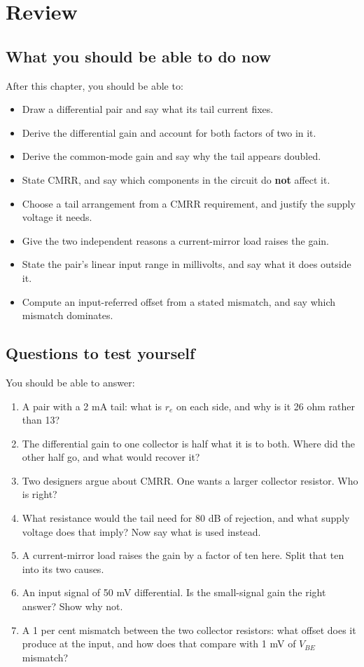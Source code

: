 

\section{Review}
\label{c9:sec:review}

\subsection*{What you should be able to do now}
After this chapter, you should be able to:
\begin{itemize}
  \item Draw a differential pair and say what its tail current fixes.
  \item Derive the differential gain and account for both factors of two in it.
  \item Derive the common-mode gain and say why the tail appears doubled.
  \item State CMRR, and say which components in the circuit do \textbf{not} affect it.
  \item Choose a tail arrangement from a CMRR requirement, and justify the supply voltage it needs.
  \item Give the two independent reasons a current-mirror load raises the gain.
  \item State the pair's linear input range in millivolts, and say what it does outside it.
  \item Compute an input-referred offset from a stated mismatch, and say which mismatch dominates.
\end{itemize}

\subsection*{Questions to test yourself}
You should be able to answer:
\begin{enumerate}
  \item A pair with a 2 mA tail: what is $r_e$ on each side, and why is it 26 ohm rather than 13?
  \item The differential gain to one collector is half what it is to both. Where did the other half go, and what would recover it?
  \item Two designers argue about CMRR. One wants a larger collector resistor. Who is right?
  \item What resistance would the tail need for 80 dB of rejection, and what supply voltage does that imply? Now say what is used instead.
  \item A current-mirror load raises the gain by a factor of ten here. Split that ten into its two causes.
  \item An input signal of 50 mV differential. Is the small-signal gain the right answer? Show why not.
  \item A 1 per cent mismatch between the two collector resistors: what offset does it produce at the input, and how does that compare with 1 mV of $V_{BE}$ mismatch?
\end{enumerate}

